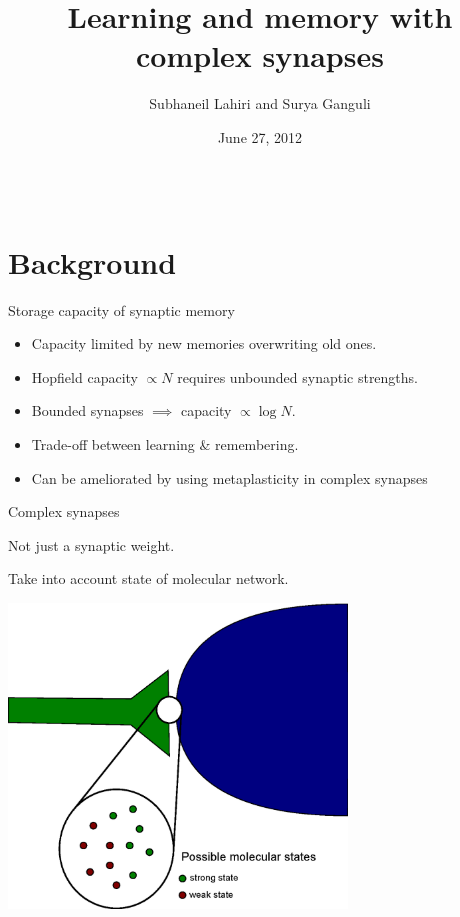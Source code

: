 \documentclass[final,hyperref={pdfpagelabels=false,bookmarks=false}]{beamer}
\title{Learning and memory with complex synapses}
\author{Subhaneil Lahiri and Surya Ganguli}
\institute[Stanford]{%
Department of Applied Physics, Stanford University, Stanford CA
}
\date[6/27/12]{June 27, 2012}
\newcommand{\net}{molecular network}
\begin{document}
\begin{frame}{}

\begin{columns}[t]


\begin{column}{0.27\linewidth}

\section{Background}


\begin{block}{Storage capacity of synaptic memory}
%
 \begin{itemize}
   \item Capacity limited by new memories overwriting old ones.
   \item Hopfield capacity $\propto N$ requires unbounded synaptic strengths.
   \item Bounded synapses $\implies$ capacity $\propto\log N$.
   \item Trade-off between learning \& remembering.
   \item Can be ameliorated by using metaplasticity in complex synapses
 \end{itemize}
%
\end{block}


\begin{block}{Complex synapses}
%
\parbox{15cm}{
 Not just a synaptic weight.

 \vp Take into account state of \net.
}
\hfill
\parbox{10cm}{
 \includegraphics[width=9cm]{synapse.eps}
}


\end{block}
\end{column}
\end{columns}
\end{frame}
\end{document}
